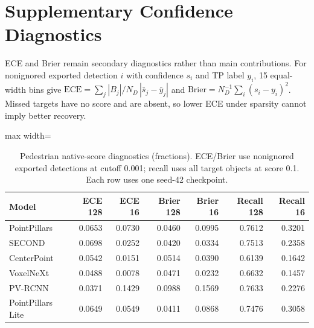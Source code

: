 \documentclass[10pt,twocolumn]{article}
\begin{document}
\section{Supplementary Confidence Diagnostics}
\label{app:calibration}
ECE and Brier remain secondary diagnostics rather than main contributions. For nonignored exported detection $i$ with confidence $s_i$ and TP label $y_i$, 15 equal-width bins give $\mathrm{ECE}=\sum_j |B_j|/N_D\,|\bar{s}_j-\bar{y}_j|$ and $\mathrm{Brier}=N_D^{-1}\sum_i(s_i-y_i)^2$. Missed targets have no score and are absent, so lower ECE under sparsity cannot imply better recovery.
\begin{table}[!tbp]
\centering\small
\caption{Pedestrian native-score diagnostics (fractions). ECE/Brier use nonignored exported detections at cutoff 0.001; recall uses all target objects at score 0.1. Each row uses one seed-42 checkpoint.}
\label{tab:calibration-results}
\begin{adjustbox}{max width=\textwidth}\begin{tabular}{lrrrrrr}
\toprule
Model & ECE 128 & ECE 16 & Brier 128 & Brier 16 & Recall 128 & Recall 16\\
\midrule
PointPillars & 0.0653 & 0.0730 & 0.0460 & 0.0995 & 0.7612 & 0.3201\\
SECOND & 0.0698 & 0.0252 & 0.0420 & 0.0334 & 0.7513 & 0.2358\\
CenterPoint & 0.0542 & 0.0151 & 0.0514 & 0.0390 & 0.6139 & 0.1642\\
VoxelNeXt & 0.0488 & 0.0078 & 0.0471 & 0.0232 & 0.6632 & 0.1457\\
PV-RCNN & 0.0371 & 0.1429 & 0.0988 & 0.1569 & 0.7633 & 0.2276\\
PointPillars Lite & 0.0649 & 0.0549 & 0.0411 & 0.0868 & 0.7476 & 0.3058\\
\bottomrule
\end{tabular}\end{adjustbox}
\end{table}
\end{document}
